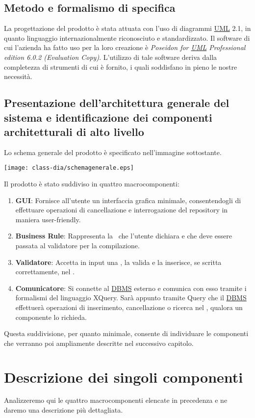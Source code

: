 \section{Metodo e formalismo di specifica}
La progettazione del prodotto \`e stata attuata con l'uso di diagrammi \underline{UML} 2.1, in quanto linguaggio internazionalmente riconosciuto e standardizzato.
Il software di cui l'azienda ha fatto uso per la loro creazione \`e \textit{Poseidon for \underline{UML} Professional edition 6.0.2 (Evaluation Copy)}. L'utilizzo di tale software deriva dalla completezza
di strumenti di cui \`e fornito, i quali soddisfano in pieno le nostre necessit\`a.

\section [Architettura generale del sistema]{Presentazione dell'architettura generale del sistema e identificazione dei componenti architetturali di alto livello}
Lo schema generale del prodotto \`e specificato nell'immagine sottostante.
\begin{center}
\texttt{[image: class-dia/schemagenerale.eps]}
\end{center}
Il prodotto \`e stato suddiviso in quattro macrocomponenti:
\begin{enumerate}
 \item \textbf{GUI}: Fornisce all'utente un interfaccia grafica minimale, consentendogli di effettuare operazioni di cancellazione e interrogazione del repository in maniera user-friendly.
\item \textbf{Business Rule}: Rappresenta la \br\ che l'utente dichiara e che deve essere passata al validatore per la compilazione.
\item \textbf{Validatore}: Accetta in input una \br, la valida e la inserisce, se scritta correttamente, nel \rp.
\item \textbf{Comunicatore}: Si connette al \underline{DBMS} esterno e comunica con esso tramite i formalismi del linguaggio XQuery.
Sar\`a appunto tramite Query che il \underline{DBMS} effettuer\`a operazioni di inserimento, cancellazione o ricerca nel \rp, qualora un componente lo richieda.
\end{enumerate}
Questa suddivisione, per quanto minimale, consente di individuare le componenti che verranno poi ampliamente descritte nel successivo capitolo.

\chapter{Descrizione dei singoli componenti}
Analizzeremo qui le quattro macrocomponenti elencate in precedenza e ne daremo una descrizione pi\`u dettagliata.

